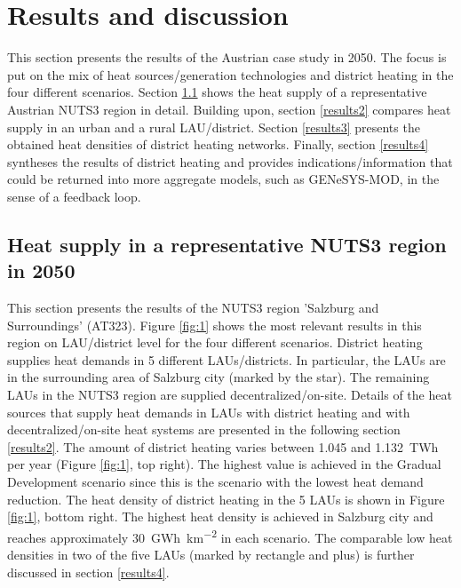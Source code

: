 \newpage
\section{Results and discussion}\label{results}
This section presents the results of the Austrian case study in 2050. The focus is put on the mix of heat sources/generation technologies and district heating in the four different scenarios. Section \ref{results1} shows the heat supply of a representative Austrian NUTS3 region in detail. Building upon, section \ref{results2} compares heat supply in an urban and a rural LAU/district. Section \ref{results3} presents the obtained heat densities of district heating networks. Finally, section \ref{results4} syntheses the results of district heating and provides indications/information that could be returned into more aggregate models, such as GENeSYS-MOD, in the sense of a feedback loop.

\subsection{Heat supply in a representative NUTS3 region in 2050}\label{results1}
This section presents the results of the NUTS3 region 'Salzburg and Surroundings' (AT323). Figure \ref{fig:1} shows the most relevant results in this region on LAU/district level for the four different scenarios. District heating supplies heat demands in 5 different LAUs/districts. In particular, the LAUs are in the surrounding area of Salzburg city (marked by the star). The remaining LAUs in the NUTS3 region are supplied decentralized/on-site. Details of the heat sources that supply heat demands in LAUs with district heating and with decentralized/on-site heat systems are presented in the following section \ref{results2}. The amount of district heating varies between \SI{1,045}{} and \SI{1,132}{TWh} per year (Figure \ref{fig:1}, top right). The highest value is achieved in the Gradual Development scenario since this is the scenario with the lowest heat demand reduction. The heat density of district heating in the 5 LAUs is shown in Figure \ref{fig:1}, bottom right. The highest heat density is achieved in Salzburg city and reaches approximately \SI{30}{GWh\per km^2} in each scenario. The comparable low heat densities in two of the five LAUs (marked by rectangle and plus) is further discussed in section \ref{results4}. 

